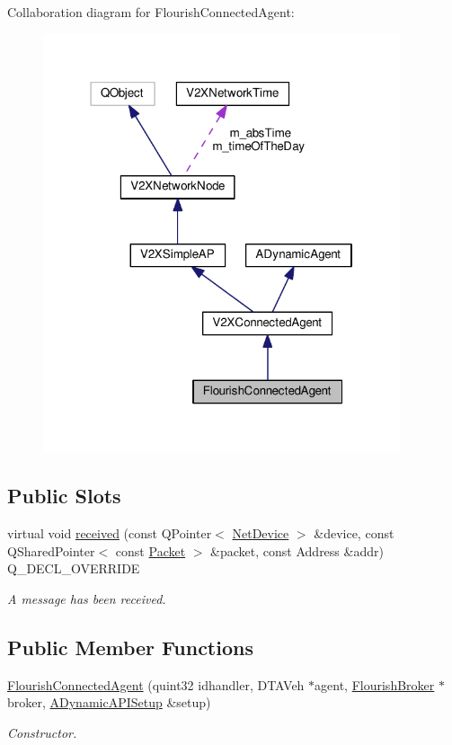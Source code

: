 Collaboration diagram for Flourish\+Connected\+Agent\+:\nopagebreak
\begin{figure}[H]
\begin{center}
\leavevmode
\includegraphics[width=298pt]{classFlourishConnectedAgent__coll__graph}
\end{center}
\end{figure}
\subsection*{Public Slots}
\begin{DoxyCompactItemize}
\item 
virtual void \hyperlink{classFlourishConnectedAgent_a9414c27bf61777bb62a7e4c565026166}{received} (const Q\+Pointer$<$ \hyperlink{classNetDevice}{Net\+Device} $>$ \&device, const Q\+Shared\+Pointer$<$ const \hyperlink{group__V2XFramework_ga1b82bfc289dbcb9aced56200d7abc964}{Packet} $>$ \&packet, const Address \&addr) Q\+\_\+\+D\+E\+C\+L\+\_\+\+O\+V\+E\+R\+R\+I\+DE
\begin{DoxyCompactList}\small\item\em A message has been received. \end{DoxyCompactList}\end{DoxyCompactItemize}
\subsection*{Public Member Functions}
\begin{DoxyCompactItemize}
\item 
\hyperlink{classFlourishConnectedAgent_a646f686674873a927b3c1c2c570dbb67}{Flourish\+Connected\+Agent} (quint32 idhandler, D\+T\+A\+Veh $\ast$agent, \hyperlink{classFlourishBroker}{Flourish\+Broker} $\ast$broker, \hyperlink{classADynamicAPISetup}{A\+Dynamic\+A\+P\+I\+Setup} \&setup)
\begin{DoxyCompactList}\small\item\em Constructor. \end{DoxyCompactList}\end{DoxyCompactItemize}
